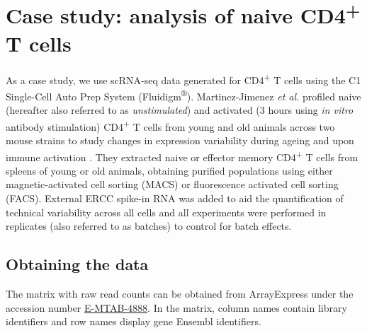\documentclass[9pt,a4paper,]{extarticle}
\begin{document}
\hypertarget{Tcells}{%
\section{\texorpdfstring{Case study: analysis of naive CD4\textsuperscript{+} T cells}{Case study: analysis of naive CD4+ T cells}}\label{Tcells}}

As a case study, we use scRNA-seq data generated for CD4\textsuperscript{+} T cells
using the C1 Single-Cell Auto Prep System (Fluidigm\textsuperscript{®}).
Martinez-Jimenez \emph{et al.} profiled naive (hereafter also referred to as
\emph{unstimulated}) and activated (3 hours using \emph{in vitro} antibody stimulation)
CD4\textsuperscript{+} T cells from young and old animals across two mouse strains to study
changes in expression variability during ageing and upon immune activation
\citep{Martinez-jimenez2017}.
They extracted naive or effector memory CD4\textsuperscript{+} T cells from spleens of young or
old animals, obtaining purified populations using either magnetic-activated cell
sorting (MACS) or fluorescence activated cell sorting (FACS).
External ERCC spike-in RNA \citep{Rna2005} was added to aid the quantification of
technical variability across all cells and all experiments were performed in
replicates (also referred to as batches) to control for batch effects.

\hypertarget{obtaining-the-data}{%
\subsection{Obtaining the data}\label{obtaining-the-data}}

The matrix with raw read counts can be obtained from ArrayExpress under the
accession number
\href{https://www.ebi.ac.uk/arrayexpress/experiments/E-MTAB-4888/}{E-MTAB-4888}.
In the matrix, column names contain library identifiers and row names
display gene Ensembl identifiers.
\end{document}
